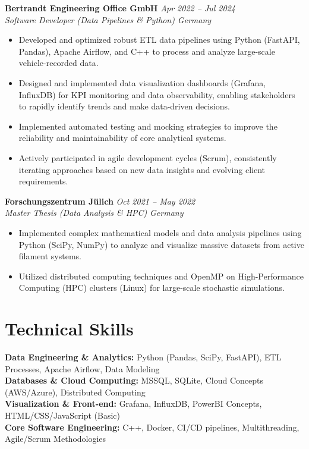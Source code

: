 \documentclass[11pt,a4paper]{article}
\newcommand{\resumeItem}[1]{
  \item \small{#1}
}
\newcommand{\resumeSubheading}[4]{
  \textbf{#1} \hfill \textit{#2} \\
  \textit{#3} \hfill \textit{#4}
}
\begin{document}
\vspace{2pt}

\resumeSubheading{Bertrandt Engineering Office GmbH}{Apr 2022 -- Jul 2024}{Software Developer (Data Pipelines \& Python)}{Germany}
\begin{itemize}[leftmargin=*, parsep=0pt, itemsep=2pt, topsep=2pt]
  \resumeItem{Developed and optimized robust ETL data pipelines using Python (FastAPI, Pandas), Apache Airflow, and C++ to process and analyze large-scale vehicle-recorded data.}
  \resumeItem{Designed and implemented data visualization dashboards (Grafana, InfluxDB) for KPI monitoring and data observability, enabling stakeholders to rapidly identify trends and make data-driven decisions.}
  \resumeItem{Implemented automated testing and mocking strategies to improve the reliability and maintainability of core analytical systems.}
  \resumeItem{Actively participated in agile development cycles (Scrum), consistently iterating approaches based on new data insights and evolving client requirements.}
\end{itemize}

\vspace{2pt}

\resumeSubheading{Forschungszentrum J\"ulich}{Oct 2021 -- May 2022}{Master Thesis (Data Analysis \& HPC)}{Germany}
\begin{itemize}[leftmargin=*, parsep=0pt, itemsep=2pt, topsep=2pt]
  \resumeItem{Implemented complex mathematical models and data analysis pipelines using Python (SciPy, NumPy) to analyze and visualize massive datasets from active filament systems.}
  \resumeItem{Utilized distributed computing techniques and OpenMP on High-Performance Computing (HPC) clusters (Linux) for large-scale stochastic simulations.}
\end{itemize}

\vspace{2pt}

\section*{Technical Skills}

\textbf{Data Engineering \& Analytics:} Python (Pandas, SciPy, FastAPI), ETL Processes, Apache Airflow, Data Modeling \\
\textbf{Databases \& Cloud Computing:} MSSQL, SQLite, Cloud Concepts (AWS/Azure), Distributed Computing \\
\textbf{Visualization \& Front-end:} Grafana, InfluxDB, PowerBI Concepts, HTML/CSS/JavaScript (Basic) \\
\textbf{Core Software Engineering:} C++, Docker, CI/CD pipelines, Multithreading, Agile/Scrum Methodologies
\end{document}
